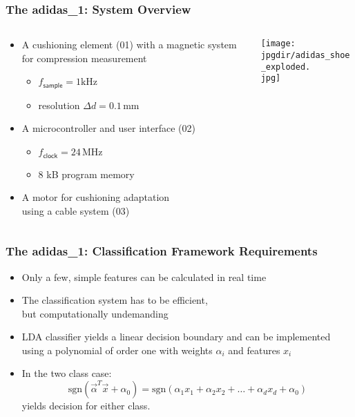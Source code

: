 \begin{frame}
	\frametitle{The adidas\_1: System Overview}

	\vspace{.5cm}

	\begin{columns}[c, onlytextwidth]
		\begin{column}{0.5\textwidth}
			\begin{itemize}
				\item A cushioning element (01) with a magnetic system for compression measurement \\
				      \begin{itemize}
					      \item $f_\mathsf{sample} = 1\mbox{kHz}$
					      \item resolution $\Delta d = 0.1\,\mbox{mm}$
				      \end{itemize}
				\item A microcontroller and user interface (02)
				      \begin{itemize}
					      \item $f_\mathsf{clock} = 24\,\mbox{MHz}$
					      \item 8 kB program memory
				      \end{itemize}
				\item A motor for cushioning adaptation \\
				      using a cable system (03)
			\end{itemize}
		\end{column}\begin{column}{0.3\textwidth}
			\texttt{[image: \\jpgdir/adidas\_shoe\_exploded.\\jpg]}
		\end{column}
	\end{columns}
\end{frame}


\begin{frame}
	\frametitle{The adidas\_1: Classification Framework Requirements}

	\begin{itemize}
		\item Only a few, simple features can be calculated in real time \\[.3cm]
		\item The classification system has to be efficient, \\
		      but computationally undemanding \\[.3cm]
		\item LDA classifier yields a linear decision boundary and can be implemented using a polynomial of order one with weights $\alpha_i$ and features $x_i$ \\[.3cm]
		\item In the two class case:
		      \begin{displaymath}
			      \mbox{sgn}(\vec\alpha^T\vec x+\alpha_0) =
			      \mbox{sgn} \left ( \alpha_1 x_1 + \alpha_2 x_2 + \ldots + \alpha_d x_d + \alpha_0 \right )
		      \end{displaymath}
		      yields decision for either class.
	\end{itemize}
\end{frame}


